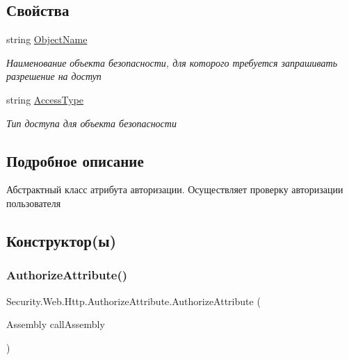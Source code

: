 \subsection*{Свойства}
\begin{DoxyCompactItemize}
\item 
string \hyperlink{class_security_1_1_web_1_1_http_1_1_authorize_attribute_a98f4e1b46077357f34393b648082b39b}{Object\+Name}
\begin{DoxyCompactList}\small\item\em Наименование объекта безопасности, для которого требуется запрашивать разрешение на доступ \end{DoxyCompactList}\item 
string \hyperlink{class_security_1_1_web_1_1_http_1_1_authorize_attribute_a0414cafbcc46d819563bda4be9c6cf64}{Access\+Type}
\begin{DoxyCompactList}\small\item\em Тип доступа для объекта безопасности \end{DoxyCompactList}\end{DoxyCompactItemize}


\subsection{Подробное описание}
Абстрактный класс атрибута авторизации. Осуществляет проверку авторизации пользователя 



\subsection{Конструктор(ы)}
\mbox{\label{class_security_1_1_web_1_1_http_1_1_authorize_attribute_a35c2f1f6e56c2c322bf9c57a4e3873c0}} 
\subsubsection{\texorpdfstring{Authorize\+Attribute()}{AuthorizeAttribute()}}
{\footnotesize\ttfamily Security.\+Web.\+Http.\+Authorize\+Attribute.\+Authorize\+Attribute (\begin{DoxyParamCaption}\item[{Assembly}]{call\+Assembly }\end{DoxyParamCaption})\hspace{0.3cm}{\ttfamily [protected]}}



